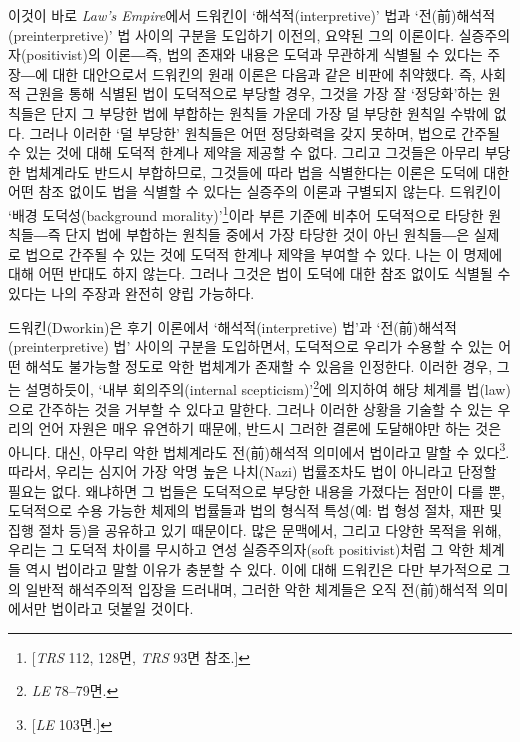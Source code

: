 이것이 바로 \emph{Law's Empire}에서 드워킨이 `해석적(interpretive)' 법과
`전(前)해석적(preinterpretive)' 법 사이의 구분을 도입하기 이전의, 요약된
그의 이론이다. 실증주의자(positivist)의 이론―즉, 법의 존재와 내용은
도덕과 무관하게 식별될 수 있다는 주장―에 대한 대안으로서 드워킨의 원래
이론은 다음과 같은 비판에 취약했다. 즉, 사회적 근원을 통해 식별된 법이
도덕적으로 부당할 경우, 그것을 가장 잘 `정당화'하는 원칙들은 단지 그
부당한 법에 부합하는 원칙들 가운데 가장 덜 부당한 원칙일 수밖에 없다.
그러나 이러한 `덜 부당한' 원칙들은 어떤 정당화력을 갖지 못하며, 법으로
간주될 수 있는 것에 대해 도덕적 한계나 제약을 제공할 수 없다. 그리고
그것들은 아무리 부당한 법체계라도 반드시 부합하므로, 그것들에 따라 법을
식별한다는 이론은 도덕에 대한 어떤 참조 없이도 법을 식별할 수 있다는
실증주의 이론과 구별되지 않는다. 드워킨이 `배경 도덕성(background
morality)'\footnote{{[}\emph{TRS} 112, 128면, \emph{TRS} 93면 참조.{]}}이라
부른 기준에 비추어 도덕적으로 타당한 원칙들―즉 단지 법에 부합하는 원칙들
중에서 가장 타당한 것이 아닌 원칙들―은 실제로 법으로 간주될 수 있는 것에
도덕적 한계나 제약을 부여할 수 있다. 나는 이 명제에 대해 어떤 반대도
하지 않는다. 그러나 그것은 법이 도덕에 대한 참조 없이도 식별될 수 있다는
나의 주장과 완전히 양립 가능하다.

드워킨(Dworkin)은 후기 이론에서 `해석적(interpretive) 법'과
`전(前)해석적(preinterpretive) 법' 사이의 구분을 도입하면서, 도덕적으로
우리가 수용할 수 있는 어떤 해석도 불가능할 정도로 악한 법체계가 존재할
수 있음을 인정한다. 이러한 경우, 그는 설명하듯이, `내부
회의주의(internal scepticism)'\footnote{\emph{LE} 78--79면.}에 의지하여
해당 체계를 법(law)으로 간주하는 것을 거부할 수 있다고 말한다. 그러나
이러한 상황을 기술할 수 있는 우리의 언어 자원은 매우 유연하기 때문에,
반드시 그러한 결론에 도달해야만 하는 것은 아니다. 대신, 아무리 악한
법체계라도 전(前)해석적 의미에서 법이라고 말할 수 있다\footnote{{[}\emph{LE}
  103면.{]}}. 따라서, 우리는 심지어 가장 악명 높은 나치(Nazi) 법률조차도
법이 아니라고 단정할 필요는 없다. 왜냐하면 그 법들은 도덕적으로 부당한
내용을 가졌다는 점만이 다를 뿐, 도덕적으로 수용 가능한 체제의 법률들과
법의 형식적 특성(예: 법 형성 절차, 재판 및 집행 절차 등)을 공유하고 있기
때문이다. 많은 문맥에서, 그리고 다양한 목적을 위해, 우리는 그 도덕적
차이를 무시하고 연성 실증주의자(soft positivist)처럼 그 악한 체계들 역시
법이라고 말할 이유가 충분할 수 있다. 이에 대해 드워킨은 다만 부가적으로
그의 일반적 해석주의적 입장을 드러내며, 그러한 악한 체계들은 오직
전(前)해석적 의미에서만 법이라고 덧붙일 것이다.

